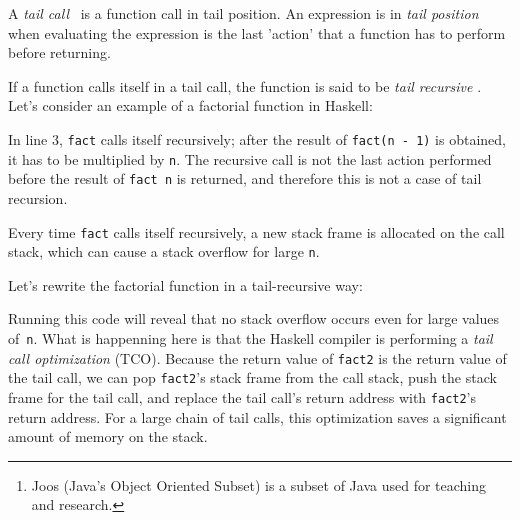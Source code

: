 \documentclass{tufte-handout}
\begin{document}
\thispagestyle{empty}
\maketitle%

\begin{abstract}
\noindent The goal of this project is to implement tail call optimization for the Joos\footnote{Joos (Java's Object Oriented Subset) is a subset of Java used for teaching and research.}-to-Assembler compiler \textit{Juice} written in Java. Tail call optimization avoids stack overflows in
functions involving tail recursion.
\end{abstract}

A \textit{tail call}%
\ is a function call in tail position. An expression is in \textit{tail position} when evaluating the expression is the last 'action' that a function has to perform before returning.

If a function calls itself in a tail call, the function is said to be \textit{tail recursive}%
. %
Let's consider an example of a factorial function in Haskell:


\noindent In line 3, \verb'fact' calls itself recursively; after the result of \verb'fact(n - 1)' is obtained, it has to be multiplied by \verb'n'. The recursive call is
not the last action performed before the result of \verb'fact n' is returned, and therefore this is not a case of tail recursion. 

Every time \verb'fact' calls itself recursively, a new stack frame is allocated on the call stack, which can cause a stack overflow for large \verb'n'. 

Let's rewrite the factorial function in a tail-recursive way:


\noindent Running this code will reveal that no stack overflow occurs even for large values of~\verb'n'. What is happenning here is that the Haskell compiler is performing a \textit{tail call optimization} (TCO). 
Because the return value of \verb'fact2' is the return value of the tail call, we can pop \verb'fact2''s stack frame from the call stack, push the stack frame for the tail call, and replace the tail call's return address with \verb'fact2''s return address. For a large chain of tail calls, this optimization saves a significant amount of memory on the stack. 
\end{document}

